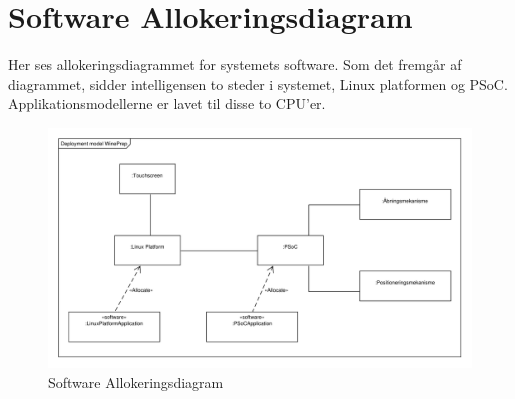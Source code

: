 \section{Software Allokeringsdiagram}

Her ses allokeringsdiagrammet for systemets software. Som det fremgår af diagrammet, sidder intelligensen to steder i
systemet, Linux platformen og PSoC. Applikationsmodellerne er lavet til disse to CPU'er. 
\begin{figure}[H]
\centering
\includegraphics[scale=0.5]{Software_Allokeringsdiagram.pdf}
\caption[Figur]{Software Allokeringsdiagram}
\end{figure}

